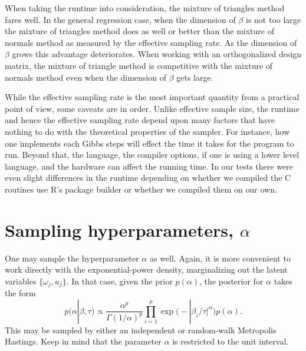 \documentclass{article}
\begin{document}
When taking the runtime into consideration, the mixture of triangles method
fares well.  In the general regression case, when the dimension of $\beta$ is
not too large the mixture of triangles method does as well or better than the
mixture of normals method as measured by the effective sampling rate.  As the
dimension of $\beta$ grows this advantage deteriorates.  When working with an
orthogonalized design matrix, the mixture of triangle method is competitive with
the mixture of normals method even when the dimension of $\beta$ gets large.

While the effective sampling rate is the most important quantity from a
practical point of view, some caveats are in order.  Unlike effective sample
size, the runtime and hence the effective sampling rate depend upon many factors
that have nothing to do with the theoretical properties of the sampler.  For
instance, how one implements each Gibbs steps will effect the time it takes for
the program to run.  Beyond that, the language, the compiler options, if one is
using a lower level language, and the hardware can affect the running time.  In
our tests there were even slight differences in the runtime depending on whether
we compiled the C routines use R's package builder or whether we compiled them
on our own.

\section{Sampling hyperparameters, $\alpha$}

One may sample the hyperparameter $\alpha$ as well.  Again, it is more
convenient to work directly with the exponential-power density, marginalizing
out the latent variables $\{\omega_j, u_j\}$.  In that case, given the prior
$p(\alpha)$, the posterior for $\alpha$ takes the form
\[
p(\alpha | \beta, \tau) \propto \frac{\alpha^p}{\Gamma(1/\alpha)^p}
\prod_{i=1}^p \exp \Big( - |\beta_i / \tau|^\alpha \Big) p (\alpha).
\]
This may be sampled by either an independent or random-walk Metropolis Hastings.
Keep in mind that the parameter $\alpha$ is restricted to the unit interval.



{}

\end{document}
